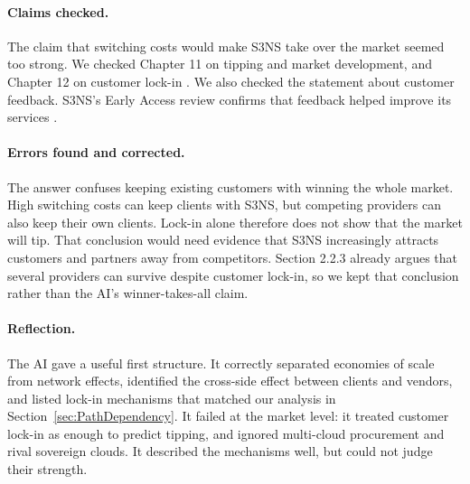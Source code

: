 
\paragraph{Claims checked.}
The claim that switching costs would make S3NS take over the market seemed too strong. We checked Chapter 11 on tipping and market development, and Chapter 12 on customer lock-in \parencite{overby2021}. We also checked the statement about customer feedback. S3NS's Early Access review confirms that feedback helped improve its services \parencite{s3ns_earlyaccess2025}.

\paragraph{Errors found and corrected.}
The answer confuses keeping existing customers with winning the whole market. High switching costs can keep clients with S3NS, but competing providers can also keep their own clients. Lock-in alone therefore does not show that the market will tip. That conclusion would need evidence that S3NS increasingly attracts customers and partners away from competitors. Section 2.2.3 already argues that several providers can survive despite customer lock-in, so we kept that conclusion rather than the AI's winner-takes-all claim.

\paragraph{Reflection.}\mbox{}{The AI gave a useful first structure. It correctly separated economies of scale from network effects, identified the cross-side effect between clients and vendors, and listed lock-in mechanisms that matched our analysis in Section~\ref{sec:PathDependency}. It failed at the market level: it treated customer lock-in as enough to predict tipping, and ignored multi-cloud procurement and rival sovereign clouds. It described the mechanisms well, but could not judge their strength.}



